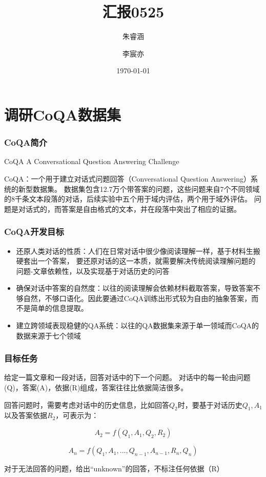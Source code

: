 \documentclass{beamer}
\title{汇报0525}
\institute{项目三}
\author{朱睿涵 \and 李宸亦}
\date{\today}
\begin{document}
\frame{\titlepage} %



\section{调研CoQA数据集}
\begin{frame}
    \frametitle{CoQA简介}
    CoQA A Conversational Question Answering Challenge

    CoQA：一个用于建立对话式问题回答（Conversational Question Answering）系统的新型数据集。
    数据集包含12.7万个带答案的问题，这些问题来自7个不同领域的8千条文本段落的对话，后续实验中五个用于域内评估，两个用于域外评估。
    问题是对话式的，而答案是自由格式的文本，并在段落中突出了相应的证据。

\end{frame}


\begin{frame}
    \frametitle{CoQA开发目标}
    \begin{itemize}
        \item 还原人类对话的性质：人们在日常对话中很少像阅读理解一样，基于材料生搬硬套出一个答案，
                要还原对话的这一本质，就需要解决传统阅读理解问题的问题-文章依赖性，以及实现基于对话历史的问答
        \item 确保对话中答案的自然度：以往的阅读理解会依赖材料截取答案，导致答案不够自然，不够口语化。因此要通过CoQA训练出形式较为自由的抽象答案，而不是简单的信息提取。
        \item 建立跨领域表现稳健的QA系统：以往的QA数据集来源于单一领域而CoQA的数据来源于七个领域
    \end{itemize}

\end{frame}

\begin{frame}
    \frametitle{目标任务}
    给定一篇文章和一段对话，回答对话中的下一个问题。
    对话中的每一轮由问题(Q)，答案(A)，依据(R)组成，答案往往比依据简洁很多。

    回答问题时，需要考虑对话中的历史信息，比如回答$Q_2$时，要基于对话历史$Q_1,A_1$以及答案依据$R_2$，可表示为：

    $$ A_2 = f(Q_1,A_1,Q_2,R_2) $$

    $$ A_n = f(Q_1,A_1,...,Q_{n-1},A_{n-1},R_n,Q_n) $$

    对于无法回答的问题，给出“unknown”的回答，不标注任何依据（R）

\end{frame}
\end{document}
